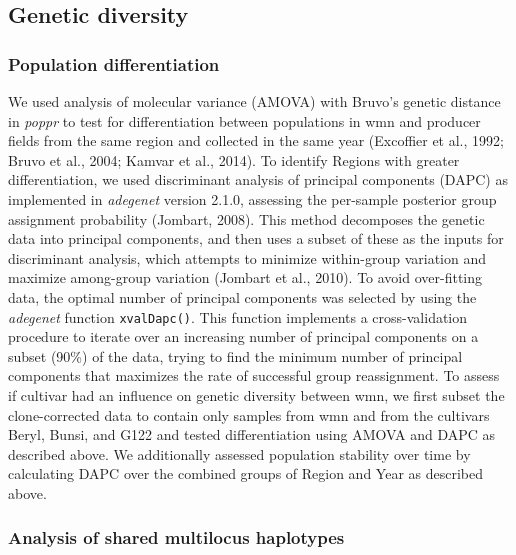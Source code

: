 \documentclass[fleqn,10pt,lineno]{wlpeerj} %
\theoremstyle{definition}
\theoremstyle{definition}
\theoremstyle{definition}
\theoremstyle{remark}
\begin{document}
\subsection*{Genetic diversity}\label{genetic-diversity}

\subsubsection*{Population
differentiation}\label{population-differentiation}

We used analysis of molecular variance (AMOVA) with Bruvo's genetic
distance in \emph{poppr} to test for differentiation between populations
in wmn and producer fields from the same region and collected in the
same year (Excoffier et al., 1992; Bruvo et al., 2004; Kamvar et al.,
2014). To identify Regions with greater differentiation, we used
discriminant analysis of principal components (DAPC) as implemented in
\emph{adegenet} version 2.1.0, assessing the per-sample posterior group
assignment probability (Jombart, 2008). This method decomposes the
genetic data into principal components, and then uses a subset of these
as the inputs for discriminant analysis, which attempts to minimize
within-group variation and maximize among-group variation (Jombart et
al., 2010). To avoid over-fitting data, the optimal number of principal
components was selected by using the \emph{adegenet} function
\texttt{xvalDapc()}. This function implements a cross-validation
procedure to iterate over an increasing number of principal components
on a subset (90\%) of the data, trying to find the minimum number of
principal components that maximizes the rate of successful group
reassignment. To assess if cultivar had an influence on genetic
diversity between wmn, we first subset the clone-corrected data to
contain only samples from wmn and from the cultivars Beryl, Bunsi, and
G122 and tested differentiation using AMOVA and DAPC as described above.
We additionally assessed population stability over time by calculating
DAPC over the combined groups of Region and Year as described above.

\subsubsection*{Analysis of shared multilocus
haplotypes}\label{analysis-of-shared-multilocus-haplotypes}
\end{document}
